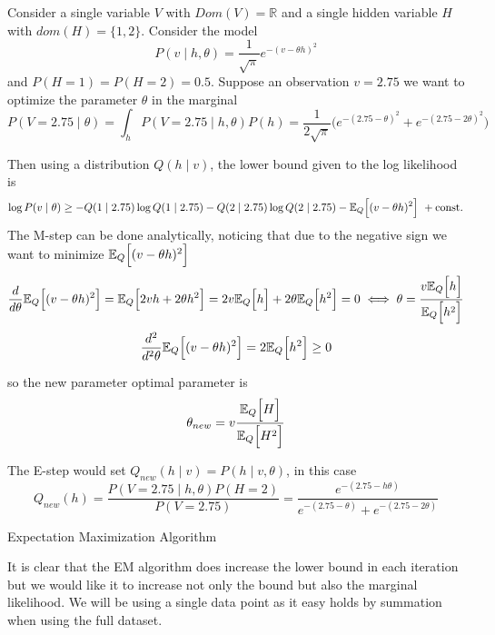 \begin{exampleth}
  Consider a single variable \(V\) with \(Dom(V) = \mathbb{R}\) and a single hidden variable \(H\) with \(dom(H) = \{1,2\}\). Consider the model
  \[
    P(v \mid h, \theta) = \frac{1}{\sqrt{\pi}}e^{-(v - \theta h)^{2}}
  \]
  and \(P(H = 1) = P(H = 2) = 0.5\). Suppose an observation \(v = 2.75\) we want to optimize the parameter \(\theta\) in the marginal
  \[
    P(V = 2.75 \mid \theta) = \int_{h} P(V = 2.75 \mid h, \theta) P(h) = \frac{1}{2\sqrt{\pi}}\big( e^{-(2.75 - \theta)^{2}} + e^{-(2.75 - 2\theta)^{2}} \big)
  \]

  Then using a distribution \(Q(h \mid v)\), the lower bound given to the log likelihood is
  \[
    \log{P(v \mid \theta)} \geq -Q(1 \mid 2.75)\log{Q(1 \mid 2.75)} - Q(2 \mid 2.75)\log{Q(2 \mid 2.75)} - \mathbb{E}_{Q}\Big[(v - \theta h)^{2}\Big]\ + \text{const.}
  \]
  The M-step can be done analytically, noticing that due to the negative sign we want to minimize \(\mathbb{E}_{Q}\Big[(v - \theta h)^{2}\Big]\)
  \[
    \frac{d}{d\theta}\mathbb{E}_{Q}\Big[(v - \theta h)^{2}\Big] = \mathbb{E}_{Q}\Big[ 2 v h + 2\theta h^{2} \Big] = 2v\mathbb{E}_{Q}\Big[h\Big] + 2\theta \mathbb{E}_{Q}\Big[h^{2}\Big] = 0 \iff \theta = \frac{v\mathbb{E}_{Q}\Big[h\Big]}{\mathbb{E}_{Q}\Big[h^{2}\Big]}
  \]
  \[
     \frac{d^{2}}{d^{2}\theta}\mathbb{E}_{Q}\Big[(v - \theta h)^{2}\Big] = 2\mathbb{E}_{Q}\Big[h^{2}\Big] \geq 0
  \]

  so the new parameter optimal parameter is
  \[
    \theta_{new} = v \frac{\mathbb{E}_{Q}\Big[H\Big]}{\mathbb{E}_{Q}\Big[H^{2}\Big]}
  \]

  The E-step would set \(Q_{new}(h \mid v) = P(h \mid v , \theta)\), in this case
  \[
    Q_{new}(h) = \frac{P(V = 2.75 \mid h, \theta)P(H = 2)}{P(V = 2.75)} = \frac{e^{-(2.75-h\theta)}}{ e^{-(2.75-\theta)} + e^{-(2.75-2\theta)}  }
  \]
\end{exampleth}

 \begin{algorithm}[t]
  \SetAlgoLined
  \KwRet{\(\theta\)}\;
  \caption{Expectation Maximization Algorithm}
  \label{alg:em}
\end{algorithm}

It is clear that the EM algorithm does increase the lower bound in each iteration but we would like it to increase not only the bound but also the marginal likelihood. We will be using a single data point as it easy holds by summation when using the full dataset.

